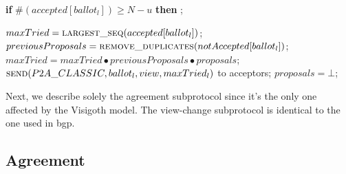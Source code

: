 \begin{algorithm}
\begin{algorithmic}[1]
		\State 
		\State \hspace{\algorithmicindent}\hspace{\algorithmicindent} \textbf{if} $\#(accepted[ballot_l]) \geq N-u$ \textbf{then} 
		\State \hspace{\algorithmicindent}\hspace{\algorithmicindent}\hspace{\algorithmicindent} ;
		
		\State
		\State $maxTried = \Call{largest\_seq}{accepted[ballot_l]}$;
		\State $previousProposals = \Call{remove\_duplicates}{notAccepted[ballot_l]}$;
		\State $maxTried = maxTried \bullet previousProposals \bullet proposals$;
		\State $\Call{send}{P2A\_CLASSIC,ballot_l,view, maxTried_l}$ to acceptors;
		\State $proposals = \bot$;
		\EndFunction
		
	\end{algorithmic}
\end{algorithm}

Next, we describe solely the agreement subprotocol since it's the only one affected by the Visigoth model. The view-change subprotocol is identical to the one used in \acrlong{bgp}.

\subsection{Agreement}

